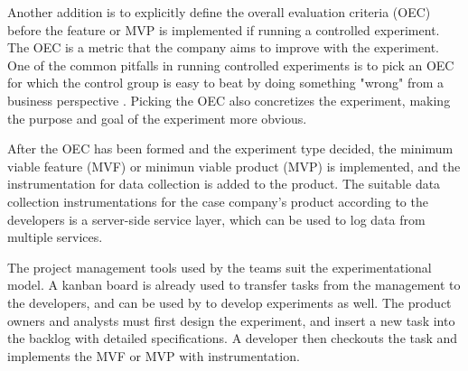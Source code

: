 \documentclass[english]{tktltiki2}
\theoremstyle{definition}
\theoremstyle{remark}
\begin{document}
Another addition is to explicitly define the overall evaluation criteria (OEC) before the feature or MVP is implemented if running a controlled experiment. The OEC is a metric that the company aims to improve with the experiment. One of the common pitfalls in running controlled experiments is to pick an OEC for which the control group is easy to beat by doing something "wrong" from a business perspective \cite{crook2009seven}. Picking the OEC also concretizes the experiment, making the purpose and goal of the experiment more obvious. 

After the OEC has been formed and the experiment type decided, the minimum viable feature (MVF) or minimun viable product (MVP) is implemented, and the instrumentation for data collection is added to the product. The suitable data collection instrumentations for the case company's product according to the developers is a server-side service layer, which can be used to log data from multiple services. 

The project management tools used by the teams suit the experimentational model. A kanban board is already used to transfer tasks from the management to the developers, and can be used by to develop experiments as well. The product owners and analysts must first design the experiment, and insert a new task into the backlog with detailed specifications. A developer then checkouts the task and implements the MVF or MVP with instrumentation. 
\end{document}
